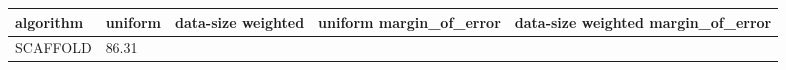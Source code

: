 \begin{tabular}{lllll}
\toprule
algorithm & uniform & data-size weighted & uniform margin_of_error & data-size weighted margin_of_error \\
\midrule
SCAFFOLD & 86.31%
\bottomrule
\end{tabular}

